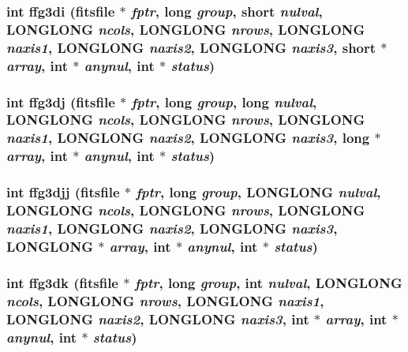\subsubsection{\setlength{\rightskip}{0pt plus 5cm}int ffg3di (\bf{fitsfile} $\ast$ {\em fptr}, long {\em group}, short {\em nulval}, \bf{LONGLONG} {\em ncols}, \bf{LONGLONG} {\em nrows}, \bf{LONGLONG} {\em naxis1}, \bf{LONGLONG} {\em naxis2}, \bf{LONGLONG} {\em naxis3}, short $\ast$ {\em array}, int $\ast$ {\em anynul}, int $\ast$ {\em status})}\label{src_2fitsio_8h_949ee59c2b5d120e7357d60a4ce6f9e8}


\subsubsection{\setlength{\rightskip}{0pt plus 5cm}int ffg3dj (\bf{fitsfile} $\ast$ {\em fptr}, long {\em group}, long {\em nulval}, \bf{LONGLONG} {\em ncols}, \bf{LONGLONG} {\em nrows}, \bf{LONGLONG} {\em naxis1}, \bf{LONGLONG} {\em naxis2}, \bf{LONGLONG} {\em naxis3}, long $\ast$ {\em array}, int $\ast$ {\em anynul}, int $\ast$ {\em status})}\label{src_2fitsio_8h_5677946e8378660c33bf9fcec0750f6f}


\subsubsection{\setlength{\rightskip}{0pt plus 5cm}int ffg3djj (\bf{fitsfile} $\ast$ {\em fptr}, long {\em group}, \bf{LONGLONG} {\em nulval}, \bf{LONGLONG} {\em ncols}, \bf{LONGLONG} {\em nrows}, \bf{LONGLONG} {\em naxis1}, \bf{LONGLONG} {\em naxis2}, \bf{LONGLONG} {\em naxis3}, \bf{LONGLONG} $\ast$ {\em array}, int $\ast$ {\em anynul}, int $\ast$ {\em status})}\label{src_2fitsio_8h_c2e9349d1c1fc906b74067636dd67391}


\subsubsection{\setlength{\rightskip}{0pt plus 5cm}int ffg3dk (\bf{fitsfile} $\ast$ {\em fptr}, long {\em group}, int {\em nulval}, \bf{LONGLONG} {\em ncols}, \bf{LONGLONG} {\em nrows}, \bf{LONGLONG} {\em naxis1}, \bf{LONGLONG} {\em naxis2}, \bf{LONGLONG} {\em naxis3}, int $\ast$ {\em array}, int $\ast$ {\em anynul}, int $\ast$ {\em status})}\label{src_2fitsio_8h_0cff4d8eb0cb5aca051a619964159b33}


